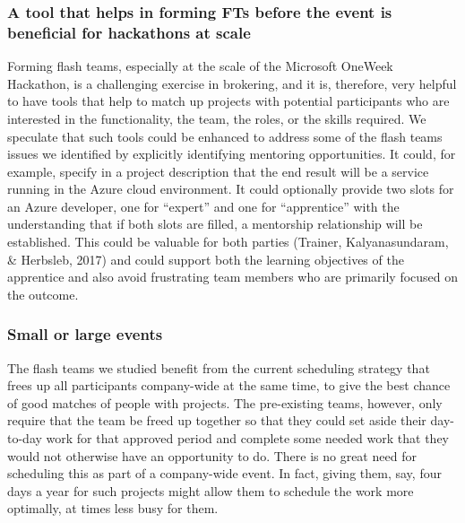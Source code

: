 \documentclass{hcij}
\begin{document}
\subsubsection{A tool that helps in forming FTs before the event is beneficial for hackathons at scale}
Forming flash teams, especially at the scale of the Microsoft OneWeek Hackathon, is a challenging exercise in brokering, and it is, therefore, very helpful to have tools that help to match up projects with potential participants who are interested in the functionality, the team, the roles, or the skills required. We speculate that such tools could be enhanced to address some of the flash teams issues we identified by explicitly identifying mentoring opportunities. It could, for example, specify in a project description that the end result will be a service running in the Azure cloud environment. It could optionally provide two slots for an Azure developer, one for “expert” and one for “apprentice” with the understanding that if both slots are filled, a mentorship relationship will be established. This could be valuable for both parties (Trainer, Kalyanasundaram, & Herbsleb, 2017) and could support both the learning objectives of the apprentice and also avoid frustrating team members who are primarily focused on the outcome.

\subsubsection{Small or large events}
The flash teams we studied benefit from the current scheduling strategy that frees up all participants company-wide at the same time, to give the best chance of good matches of people with projects.  The pre-existing teams, however, only require that the team be freed up together so that they could set aside their day-to-day work for that approved period and complete some needed work that they would not otherwise have an opportunity to do. There is no great need for scheduling this as part of a company-wide event. In fact, giving them, say, four days a year for such projects might allow them to schedule the work more optimally, at times less busy for them.
\end{document}
